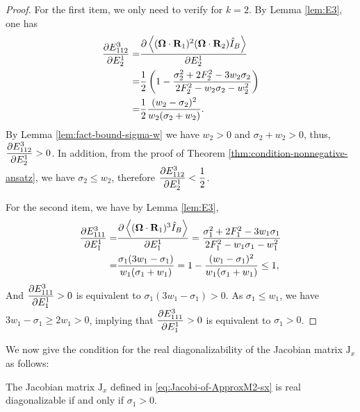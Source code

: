 \begin{proof}
  For the first item, we only need to verify for $k=2$. By Lemma \ref{lem:E3},
  one has
  \[
  \begin{split}
    \dfrac{\partial E^3_{112}}{\partial E^1_2} = & \dfrac{\partial \left\langle (\boldsymbol{\Omega}\cdot\mathbf{R}_1)^2
        (\boldsymbol{\Omega}\cdot\mathbf{R}_2) \hat I_B \right\rangle}{\partial E^1_2} \\ = & \dfrac12\left(1 -
      \dfrac{\sigma_2^2 + 2 F_2^2 - 3 w_2 \sigma_2}{2 F_2^2 - w_2
        \sigma_2 -w_2^2}\right) \\
    = & \dfrac12 \dfrac{(w_2 - \sigma_2)^2}{w_2 (\sigma_2 + w_2)}.
  \end{split}
  \]
  By Lemma \ref{lem:fact-bound-sigma-w} we have $w_2 > 0$ and 
  $\sigma_2 + w_2 > 0$, thus, $\dfrac{\partial E^3_{112}}{\partial E^1_2} > 0$. 
  In addition, from the proof of Theorem \ref{thm:condition-nonnegative-ansatz},
  we have $\sigma_2 \leq w_2$, therefore $\dfrac{\partial E^3_{112}}{\partial E^1_2} < \dfrac12$.

  For the second item, we have by Lemma \ref{lem:E3},
 \[
 \begin{aligned}
   \dfrac{\partial E^3_{111}}{\partial E^1_1} = & \dfrac{\partial \left\langle (\boldsymbol{\Omega}\cdot\mathbf{R}_1)^3
       \hat I_B \right\rangle}{\partial E^1_1} 
   = \dfrac{\sigma_1^2 + 2 F_1^2 - 3 w_1 \sigma_1}{2 F_1^2 - w_1
     \sigma_1 -w_1^2} \\
   = &\dfrac{\sigma_1 (3 w_1 - \sigma_1)}{w_1 (\sigma_1 + w_1)}
   = 1 - \dfrac{(w_1 - \sigma_1)^2}{w_1 (\sigma_1 + w_1)} \leq 1,
 \end{aligned}
 \]
 And $\dfrac{\partial E^3_{111}}{\partial E^1_1} > 0$ is equivalent to
 $\sigma_1 (3 w_1 - \sigma_1) > 0$. As $\sigma_1 \leq w_1$,
 we have $3 w_1 - \sigma_1 \geq 2 w_1 > 0$, implying that
 $\dfrac{\partial E^3_{111}}{\partial E^1_1} > 0$ is equivalent to $\sigma_1 > 0$.
\end{proof}
We now give the condition for the real diagonalizability of the Jacobian
matrix $\boldsymbol{\mathrm{J}}_x$ as follows:
\begin{theorem}\label{lem:Jx-invertible}
  The Jacobian matrix $\boldsymbol{\mathrm{J}}_x$ defined in
  \eqref{eq:Jacobi-of-ApproxM2-sx} is real diagonalizable
  if and only if $\sigma_1 > 0$.
\end{theorem}
